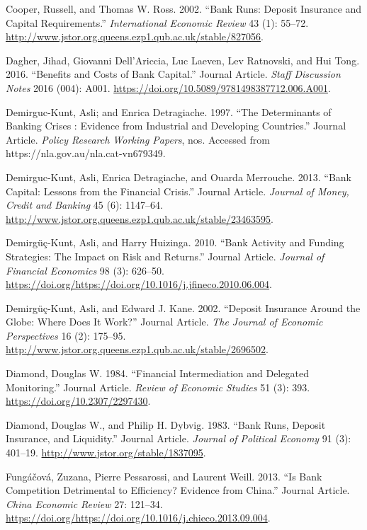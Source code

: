 \documentclass{article}
\begin{document}
\leavevmode\hypertarget{ref-RN37}{}%
Cooper, Russell, and Thomas W. Ross. 2002. ``Bank Runs: Deposit
Insurance and Capital Requirements.'' \emph{International Economic
Review} 43 (1): 55--72.
\url{http://www.jstor.org.queens.ezp1.qub.ac.uk/stable/827056}.

\leavevmode\hypertarget{ref-RN40}{}%
Dagher, Jihad, Giovanni Dell'Ariccia, Luc Laeven, Lev Ratnovski, and Hui
Tong. 2016. ``Benefits and Costs of Bank Capital.'' Journal Article.
\emph{Staff Discussion Notes} 2016 (004): A001.
\url{https://doi.org/10.5089/9781498387712.006.A001}.

\leavevmode\hypertarget{ref-RN41}{}%
Demirguc-Kunt, Asli; and Enrica Detragiache. 1997. ``The Determinants of
Banking Crises : Evidence from Industrial and Developing Countries.''
Journal Article. \emph{Policy Research Working Papers}, nos. Accessed
from https://nla.gov.au/nla.cat-vn679349.

\leavevmode\hypertarget{ref-RN42}{}%
Demirguc-Kunt, Asli, Enrica Detragiache, and Ouarda Merrouche. 2013.
``Bank Capital: Lessons from the Financial Crisis.'' Journal Article.
\emph{Journal of Money, Credit and Banking} 45 (6): 1147--64.
\url{http://www.jstor.org.queens.ezp1.qub.ac.uk/stable/23463595}.

\leavevmode\hypertarget{ref-RN43}{}%
Demirgüç-Kunt, Asli, and Harry Huizinga. 2010. ``Bank Activity and
Funding Strategies: The Impact on Risk and Returns.'' Journal Article.
\emph{Journal of Financial Economics} 98 (3): 626--50.
\url{https://doi.org/https://doi.org/10.1016/j.jfineco.2010.06.004}.

\leavevmode\hypertarget{ref-RN44}{}%
Demirgüç-Kunt, Asli, and Edward J. Kane. 2002. ``Deposit Insurance
Around the Globe: Where Does It Work?'' Journal Article. \emph{The
Journal of Economic Perspectives} 16 (2): 175--95.
\url{http://www.jstor.org.queens.ezp1.qub.ac.uk/stable/2696502}.

\leavevmode\hypertarget{ref-RN45}{}%
Diamond, Douglas W. 1984. ``Financial Intermediation and Delegated
Monitoring.'' Journal Article. \emph{Review of Economic Studies} 51 (3):
393. \url{https://doi.org/10.2307/2297430}.

\leavevmode\hypertarget{ref-RN46}{}%
Diamond, Douglas W., and Philip H. Dybvig. 1983. ``Bank Runs, Deposit
Insurance, and Liquidity.'' Journal Article. \emph{Journal of Political
Economy} 91 (3): 401--19. \url{http://www.jstor.org/stable/1837095}.

\leavevmode\hypertarget{ref-RN47}{}%
Fungáčová, Zuzana, Pierre Pessarossi, and Laurent Weill. 2013. ``Is Bank
Competition Detrimental to Efficiency? Evidence from China.'' Journal
Article. \emph{China Economic Review} 27: 121--34.
\url{https://doi.org/https://doi.org/10.1016/j.chieco.2013.09.004}.
\end{document}
